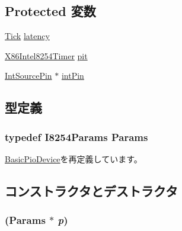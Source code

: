 \subsection*{Protected 変数}
\begin{DoxyCompactItemize}
\item 
\hyperlink{base_2types_8hh_a5c8ed81b7d238c9083e1037ba6d61643}{Tick} \hyperlink{classX86ISA_1_1I8254_ac8d8966078cc047949fd1bca8feb21b6}{latency}
\item 
\hyperlink{classX86ISA_1_1I8254_1_1X86Intel8254Timer}{X86Intel8254Timer} \hyperlink{classX86ISA_1_1I8254_a5559b5258c033557490373c27bd673cc}{pit}
\item 
\hyperlink{classX86ISA_1_1IntSourcePin}{IntSourcePin} $\ast$ \hyperlink{classX86ISA_1_1I8254_abc04d372f6b8e69a72f4c25db91ede99}{intPin}
\end{DoxyCompactItemize}


\subsection{型定義}
\hypertarget{classX86ISA_1_1I8254_aed9bbf7fa13cb3e5f1c7805d04bffb78}{
\subsubsection[{Params}]{\setlength{\rightskip}{0pt plus 5cm}typedef I8254Params {\bf Params}}}
\label{classX86ISA_1_1I8254_aed9bbf7fa13cb3e5f1c7805d04bffb78}


\hyperlink{classBasicPioDevice_a2845515ac6467f10540747053c8a0449}{BasicPioDevice}を再定義しています。

\subsection{コンストラクタとデストラクタ}
\hypertarget{classX86ISA_1_1I8254_a05e554921bd92c71c55863df9cea8564}{
\subsubsection[{I8254}]{ ({\bf Params} $\ast$ {\em p})}}
\label{classX86ISA_1_1I8254_a05e554921bd92c71c55863df9cea8564}



